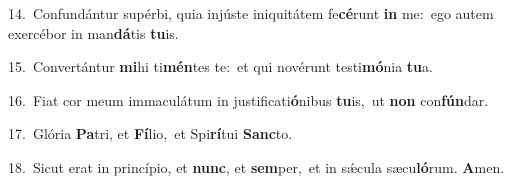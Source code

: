 {\numbfont\textcolor{\numbcolor}{14.}}~Confundántur supérbi, quia injúste iniquitátem fe\-\textbf{cé}\-runt \textbf{in} me:~\star ego autem exercébor in man\-\textbf{dá}\-tis \textbf{tu}\-is.\par
{\numbfont\textcolor{\numbcolor}{15.}}~Convertántur \textbf{mi}\-hi ti\-\textbf{mén}\-tes te:~\star et qui novérunt testi\-\textbf{mó}\-nia \textbf{tu}\-a.\par
{\numbfont\textcolor{\numbcolor}{16.}}~Fiat cor meum immaculátum in justificati\-\textbf{ó}\-nibus \textbf{tu}\-is,~\star ut \textbf{non} con\-\textbf{fún}\-dar.\par
{\numbfont\textcolor{\numbcolor}{17.}}~Glória \textbf{Pa}\-tri, et \textbf{Fí}\-lio,~\star et Spi\-\textbf{rí}\-tui \textbf{Sanc}\-to.\par
{\numbfont\textcolor{\numbcolor}{18.}}~Sicut erat in princípio, et \textbf{nunc}\-, et \textbf{sem}\-per,~\star et in sǽcula sæcu\-\textbf{ló}\-rum. \textbf{A}\-men.\par

